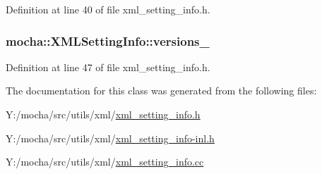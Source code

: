 Definition at line 40 of file xml\_\-setting\_\-info.h.

\hypertarget{classmocha_1_1_x_m_l_setting_info_ae097a8846946f392c4baf6674346773a}{
\subsubsection[{versions\_\-}]{ {\bf mocha::XMLSettingInfo::versions\_\-}}}
\label{classmocha_1_1_x_m_l_setting_info_ae097a8846946f392c4baf6674346773a}


Definition at line 47 of file xml\_\-setting\_\-info.h.



The documentation for this class was generated from the following files:\begin{DoxyCompactItemize}
\item 
Y:/mocha/src/utils/xml/\hyperlink{xml__setting__info_8h}{xml\_\-setting\_\-info.h}\item 
Y:/mocha/src/utils/xml/\hyperlink{xml__setting__info-inl_8h}{xml\_\-setting\_\-info-\/inl.h}\item 
Y:/mocha/src/utils/xml/\hyperlink{xml__setting__info_8cc}{xml\_\-setting\_\-info.cc}\end{DoxyCompactItemize}
